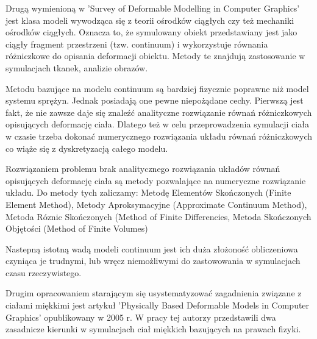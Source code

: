 Drugą wymienioną w 'Survey of Deformable Modelling in Computer Graphics' jest
klasa modeli wywodząca się z teorii ośrodków ciągłych czy też mechaniki ośrodków
ciągłych. Oznacza to, że symulowany obiekt przedstawiany jest jako ciągły
fragment przestrzeni (tzw. continuum) i wykorzystuje równania różniczkowe do
opisania deformacji obiektu. Metody te znajdują zastosowanie w symulacjach
tkanek, analizie obrazów.\cite{TR97-19}

Metodu bazujące na modelu continuum są bardziej fizycznie poprawne niż model
systemu sprężyn\cite{TR97-19}. Jednak posiadają one pewne niepożądane cechy.
Pierwszą jest fakt, że nie zawsze daje się znaleźć analityczne rozwiązanie
równań różniczkowych opisujących deformację ciała. Dlatego też w celu
przeprowadzenia symulacji ciała w czasie trzeba dokonać numerycznego rozwiązania
układu równań różniczkowych co wiąże się z dyskretyzacją całego modelu.

Rozwiązaniem problemu brak analitycznego rozwiązania układów równań opisujących
deformację ciała są metody pozwalające na numeryczne rozwiązanie układu. Do
metody tych zaliczamy: Metodę Elementów Skończonych (Finite Element Method),
 Metody Aproksymacyjne (Approximate Continuum Method), Metoda Róznic Skończonych
 (Method of Finite Differencies, Metoda Skończonych Objętości (Method of Finite
 Volumes)

Nastepną istotną wadą modeli continuum jest ich duża złożoność obliczeniowa
czyniąca je trudnymi, lub wręcz niemożliwymi do zastowowania w symulacjach czasu
rzeczywistego.

Drugim opracowaniem starającym się usystematyzować zagadnienia związane z
ciałami miękkimi jest artykuł 'Physically Based Deformable Models in Computer
Graphics' opublikowany w 2005 r. W pracy tej autorzy przedstawili dwa
zasadnicze kierunki w symulacjach ciał miękkich bazujących na prawach fizyki.

